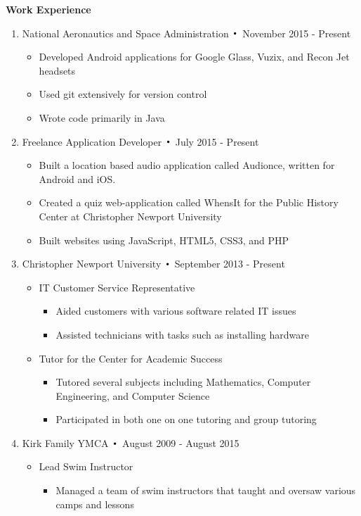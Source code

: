 \noindent\textbf{\large Work Experience}
\begin{enumerate}[label={\Roman*}.]
\item National Aeronautics and Space Administration $\Bigcdot$ November 2015 - Present
\begin{itemize}
\item Developed Android applications for Google Glass, Vuzix, and Recon Jet headsets
\item Used git extensively for version control
\item Wrote code primarily in Java
\end{itemize}
\item Freelance Application Developer $\Bigcdot$ July 2015 - Present
\begin{itemize}
\item Built a location based audio application called Audionce, written for Android and iOS.
\item Created a quiz web-application called WhensIt for the Public History Center at Christopher Newport
University
\item Built websites using JavaScript, HTML5, CSS3, and PHP
\end{itemize}
\item Christopher Newport University $\Bigcdot$ September 2013 - Present
\begin{itemize}
\item IT Customer Service Representative
\begin{itemize}
\item Aided customers with various software related IT issues
\item Assisted technicians with tasks such as installing hardware
\end{itemize}
\item Tutor for the Center for Academic Success
\begin{itemize}
\item Tutored several subjects including Mathematics, Computer Engineering, and Computer Science
\item Participated in both one on one tutoring and group tutoring
\end{itemize}
\end{itemize}
\item Kirk Family YMCA $\Bigcdot$ August 2009 - August 2015
\begin{itemize}
\item Lead Swim Instructor
\begin{itemize}
\item Managed a team of swim instructors that taught and oversaw various camps and lessons

\end{itemize}
\end{itemize}
\end{enumerate}
